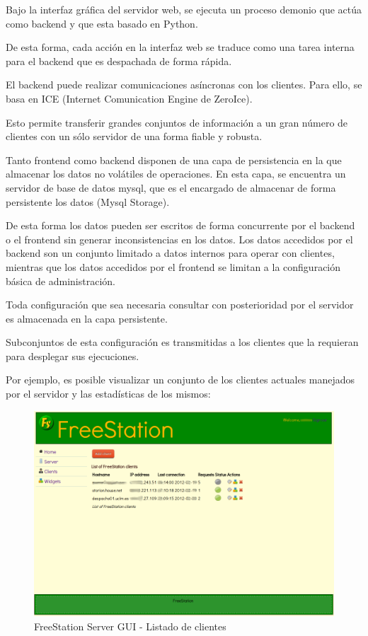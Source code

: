 Bajo la interfaz gráfica del servidor web, se ejecuta un proceso demonio
que actúa como backend y que esta basado en Python.

De esta forma, cada acción en la interfaz web se traduce como una tarea
interna para el backend que es despachada de forma rápida.

El backend puede realizar comunicaciones asíncronas con los clientes. Para
ello, se basa en \acs{ICE}\label{acro:ICE} (Internet Comunication Engine de
ZeroIce).

Esto permite transferir grandes conjuntos de información a un gran número de
clientes con un sólo servidor de una forma fiable y robusta.

Tanto frontend como backend disponen de una capa de persistencia en la que
almacenar los datos no volátiles de operaciones. En esta capa, se encuentra un
servidor de base de datos mysql, que es el encargado de almacenar de forma
persistente los datos (Mysql Storage).

De esta forma los datos pueden ser escritos de forma concurrente por el backend
o el frontend sin generar inconsistencias en los datos.
\newpage
Los datos accedidos por el backend son un conjunto limitado a datos internos
para operar con clientes, mientras que los datos accedidos por el frontend se
limitan a la configuración básica de administración.

Toda configuración que sea necesaria consultar con posterioridad por el
servidor es almacenada en la capa persistente.

Subconjuntos de esta configuración es transmitidas a
los clientes que la requieran para desplegar sus ejecuciones.

Por ejemplo, es posible visualizar un conjunto de los clientes actuales
manejados por el servidor y las estadísticas de los mismos:

\begin{figure}[ht]
    \begin{center}
        \includegraphics[scale=0.45]{src/img/freestation-server-clients.png}
        \caption[FreeStation Server
        GUI - Listado de clientes] {FreeStation Server GUI - Listado de clientes}
        \label{client_list}
    \end{center}
\end{figure}

